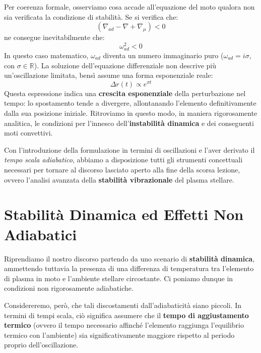 Per coerenza formale, osserviamo cosa accade all'equazione del moto qualora non sia verificata la condizione di stabilità.
Se si verifica che:
\begin{equation}
\left( \nabla_{ad} - \nabla + \nabla_\mu \right) < 0
\end{equation}
ne consegue inevitabilmente che:
\begin{equation}
\omega_{ad}^2 < 0
\end{equation}
In questo caso matematico, $\omega_{ad}$ diventa un numero immaginario puro ($\omega_{ad} = i \sigma$, con $\sigma \in \mathbb{R}$). La soluzione dell'equazione differenziale non descrive più un'oscillazione limitata, bensì assume una forma esponenziale reale:
\begin{equation}
\Delta r(t) \propto e^{\sigma t}
\end{equation}
Questa espressione indica una \textbf{crescita esponenziale} della perturbazione nel tempo: lo spostamento tende a divergere, allontanando l'elemento definitivamente dalla sua posizione iniziale. Ritroviamo in questo modo, in maniera rigorosamente analitica, le condizioni per l'innesco dell'\textbf{instabilità dinamica} e dei conseguenti moti convettivi.

\vspace{1em}
Con l'introduzione della formulazione in termini di oscillazioni e l'aver derivato il \textit{tempo scala adiabatico}, abbiamo a disposizione tutti gli strumenti concettuali necessari per tornare al discorso lasciato aperto alla fine della scorsa lezione, ovvero l'analisi avanzata della \textbf{stabilità vibrazionale} del plasma stellare.

\section{Stabilità Dinamica ed Effetti Non Adiabatici}

Riprendiamo il nostro discorso partendo da uno scenario di \textbf{stabilità dinamica}, ammettendo tuttavia la presenza di una differenza di temperatura tra l'elemento di plasma in moto e l'ambiente stellare circostante. Ci poniamo dunque in condizioni non rigorosamente adiabatiche.

Considereremo, però, che tali discostamenti dall'adiabaticità siano piccoli. In termini di tempi scala, ciò significa assumere che il \textbf{tempo di aggiustamento termico} (ovvero il tempo necessario affinché l'elemento raggiunga l'equilibrio termico con l'ambiente) sia significativamente maggiore rispetto al periodo proprio dell'oscillazione.

